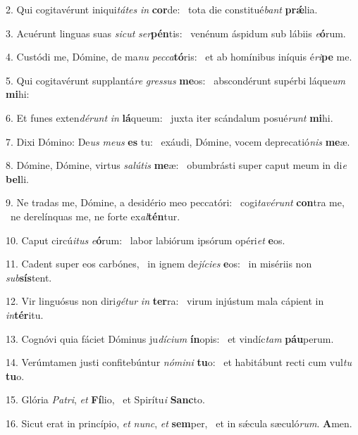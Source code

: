 2. Qui cogitavérunt iniqui\textit{tá}\textit{tes} \textit{in} \textbf{cor}de: \ast\  tota die constitué\textit{bant} \textbf{prǽ}lia.\

3. Acuérunt linguas suas \textit{sic}\textit{ut} \textit{ser}\textbf{pén}tis: \ast\  venénum áspidum sub lábiis \textit{e}\textbf{ó}rum.\

4. Custódi me, Dómine, de ma\textit{nu} \textit{pec}\textit{ca}\textbf{tó}ris: \ast\  et ab homínibus iníquis é\textit{ri}\textbf{pe} me.\

5. Qui cogitavérunt supplantá\textit{re} \textit{gres}\textit{sus} \textbf{me}os: \ast\  abscondérunt supérbi láque\textit{um} \textbf{mi}hi:\

6. Et funes exten\textit{dé}\textit{runt} \textit{in} \textbf{lá}queum: \ast\  juxta iter scándalum posué\textit{runt} \textbf{mi}hi.\

7. Dixi Dómino: De\textit{us} \textit{me}\textit{us} \textbf{es} tu: \ast\  exáudi, Dómine, vocem deprecatió\textit{nis} \textbf{me}æ.\

8. Dómine, Dómine, virtus \textit{sa}\textit{lú}\textit{tis} \textbf{me}æ: \ast\  obumbrásti super caput meum in di\textit{e} \textbf{bel}li.\

9. Ne tradas me, Dómine, a desidério meo peccatóri: \dag\  cogi\textit{ta}\textit{vé}\textit{runt} \textbf{con}tra me, \ast\  ne derelínquas me, ne forte ex\textit{al}\textbf{tén}tur.\

10. Caput circú\textit{i}\textit{tus} \textit{e}\textbf{ó}rum: \ast\  labor labiórum ipsórum opéri\textit{et} \textbf{e}os.\

11. Cadent super eos carbónes, \dag\  in ignem de\textit{jí}\textit{ci}\textit{es} \textbf{e}os: \ast\  in misériis non \textit{sub}\textbf{sís}tent.\

12. Vir linguósus non diri\textit{gé}\textit{tur} \textit{in} \textbf{ter}ra: \ast\  virum injústum mala cápient in \textit{in}\textbf{tér}itu.\

13. Cognóvi quia fáciet Dóminus ju\textit{dí}\textit{ci}\textit{um} \textbf{ín}opis: \ast\  et vindíc\textit{tam} \textbf{páu}perum.\

14. Verúmtamen justi confitebúntur \textit{nó}\textit{mi}\textit{ni} \textbf{tu}o: \ast\  et habitábunt recti cum vul\textit{tu} \textbf{tu}o.\

15. Glória \textit{Pa}\textit{tri}, \textit{et} \textbf{Fí}lio, \ast\  et Spirítu\textit{i} \textbf{Sanc}to.\

16. Sicut erat in princípio, \textit{et} \textit{nunc}, \textit{et} \textbf{sem}per, \ast\  et in sǽcula sæculó\textit{rum}. \textbf{A}men.\

